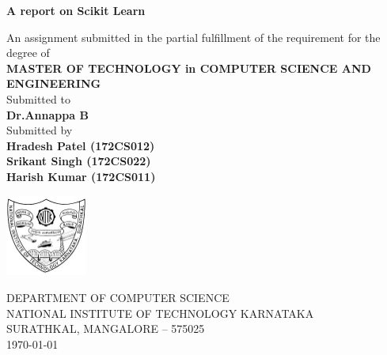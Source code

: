 \documentclass[12pt]{article}
\begin{document}
\begin{titlepage}
        \begin{center}
        
        \Huge
        \textbf{A report on Scikit Learn}
        
        \vspace{0.4cm}
        \large
         
        An assignment submitted in the partial fulfillment of the requirement for the degree of\\ 
        \vspace{0.4cm}
        \textbf{MASTER OF TECHNOLOGY in
COMPUTER SCIENCE AND ENGINEERING
        }\\
        \vspace{0.25cm}
        Submitted to\\
        \textbf{Dr.Annappa B\\}
         \vspace{0.25cm}
        Submitted by\\
        \textbf{Hradesh Patel (172CS012)\\}
        \textbf{Srikant Singh (172CS022)\\}
        \textbf{Harish  Kumar  (172CS011)\\}
        
        \vspace{1.55cm}
        
        \includegraphics[width=0.2\textwidth]{NITK_Emblem.png}
    
        \vspace{0.2cm}
        \Large
        DEPARTMENT OF COMPUTER SCIENCE\\
        \vspace{0.4cm}
        NATIONAL INSTITUTE OF TECHNOLOGY KARNATAKA\\
        SURATHKAL, MANGALORE – 575025\\
        \vspace{0.4cm}
        \today
        
        \end{center}
    \end{titlepage}
    
    
\end{document}
